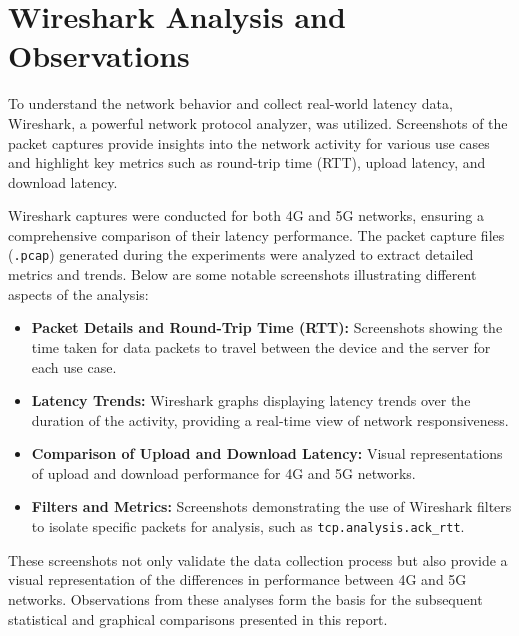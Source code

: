 \documentclass[conference]{IEEEtran}
\begin{document}
\section{Wireshark Analysis and Observations}

To understand the network behavior and collect real-world latency data, Wireshark, a powerful network protocol analyzer, was utilized. Screenshots of the packet captures provide insights into the network activity for various use cases and highlight key metrics such as round-trip time (RTT), upload latency, and download latency.

Wireshark captures were conducted for both 4G and 5G networks, ensuring a comprehensive comparison of their latency performance. The packet capture files (\texttt{.pcap}) generated during the experiments were analyzed to extract detailed metrics and trends. Below are some notable screenshots illustrating different aspects of the analysis:

\begin{itemize}
    \item \textbf{Packet Details and Round-Trip Time (RTT):} Screenshots showing the time taken for data packets to travel between the device and the server for each use case.
    \item \textbf{Latency Trends:} Wireshark graphs displaying latency trends over the duration of the activity, providing a real-time view of network responsiveness.
    \item \textbf{Comparison of Upload and Download Latency:} Visual representations of upload and download performance for 4G and 5G networks.
    \item \textbf{Filters and Metrics:} Screenshots demonstrating the use of Wireshark filters to isolate specific packets for analysis, such as \texttt{tcp.analysis.ack\_rtt}.
\end{itemize}

These screenshots not only validate the data collection process but also provide a visual representation of the differences in performance between 4G and 5G networks. Observations from these analyses form the basis for the subsequent statistical and graphical comparisons presented in this report.
\end{document}

